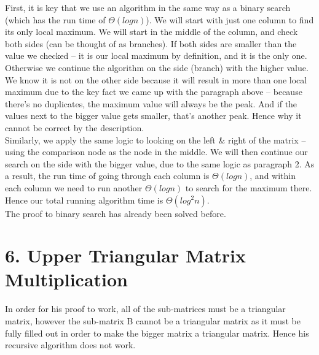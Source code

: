 \documentclass[11pt]{article}
\begin{document}
First, it is key that we use an algorithm in the same way as a binary search (which has the run time of $\Theta(logn)$). We will start with just one column to find its only local maximum. We will start in the middle of the column, and check both sides (can be thought of as branches). If both sides are smaller than the value we checked -- it is our local maximum by definition, and it is the only one. Otherwise we continue the algorithm on the side (branch) with the higher value. We know it is not on the other side because it will result in more than one local maximum due to the key fact we came up with the paragraph above -- because there's no duplicates, the maximum value will always be the peak. And if the values next to the bigger value gets smaller, that's another peak. Hence why it cannot be correct by the description. \\

Similarly, we apply the same logic to looking on the left \& right of the matrix -- using the comparison node as the node in the middle. We will then continue our search on the side with the bigger value, due to the same logic as paragraph 2. As a result, the run time of going through each column is $\Theta(logn)$, and within each column we need to run another $\Theta(logn)$ to search for the maximum there. Hence our total running algorithm time is $\Theta(log^{2}n)$. \\

The proof to binary search has already been solved before. 


\newpage
\section*{6. Upper Triangular Matrix Multiplication}
In order for his proof to work, all of the sub-matrices must be a triangular matrix, however the sub-matrix B cannot be a triangular matrix as it must be fully filled out in order to make the bigger matrix a triangular matrix. Hence his recursive algorithm does not work. 
\end{document}
